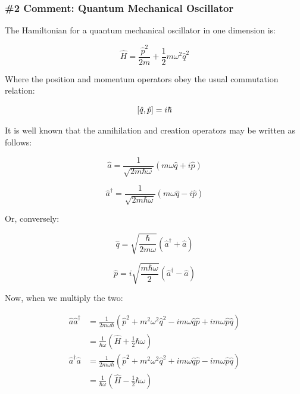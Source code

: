 \documentclass[12pt,a4paper]{report}
\begin{document}
\subsubsection{\#2 Comment: Quantum Mechanical Oscillator}

The Hamiltonian for a quantum mechanical oscillator in one dimension is:

\begin{equation}
    \hat{H}=\frac{\hat{p}^2}{2m}+\frac{1}{2}m\omega^2\hat{q}^2
\end{equation}

Where the position and momentum operators obey the usual commutation relation:

\begin{equation}
    \comm{\hat{q}}{\hat{p}}=i\hbar
\end{equation}

It is well known that the annihilation and creation operators may be written as follows:

\begin{equation}
    \hat{a}=\frac{1}{\sqrt{2m\hbar\omega}}(m\omega \hat{q} + i\hat{p})
\end{equation}

\begin{equation}
    \hat{a}^{\dag}=\frac{1}{\sqrt{2m\hbar\omega}}(m\omega \hat{q}-i\hat{p})
\end{equation}

Or, conversely:

\begin{equation}
    \hat{q}=\sqrt{\frac{\hbar}{2m\omega}}(\hat{a}^{\dag}+\hat{a})
\end{equation}

\begin{equation}
    \hat{p}=i\sqrt{\frac{m\hbar\omega}{2}}(\hat{a}^{\dag}-\hat{a})
\end{equation}

Now, when we multiply the two:

\begin{align}
    \hat{a}\hat{a}^{\dag}&=\frac{1}{2m\omega\hbar}(\hat{p}^2+m^2\omega^2\hat{q}^2-im\omega \hat{q}\hat{p}+im\omega \hat{p}\hat{q})\\
            &=\frac{1}{\hbar\omega}(\hat{H}+\frac{1}{2}\hbar\omega)
\end{align}
\begin{align}
    \hat{a}^{\dag}\hat{a}&=\frac{1}{2m\omega\hbar}(\hat{p}^2+m^2\omega^2\hat{q}^2+im\omega \hat{q}\hat{p}-im\omega \hat{p}\hat{q})\\
            &=\frac{1}{\hbar\omega}(\hat{H}-\frac{1}{2}\hbar\omega)
\end{align}
\end{document}
